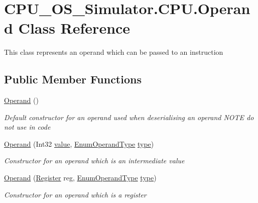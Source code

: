\hypertarget{class_c_p_u___o_s___simulator_1_1_c_p_u_1_1_operand}{}\section{C\+P\+U\+\_\+\+O\+S\+\_\+\+Simulator.\+C\+P\+U.\+Operand Class Reference}
\label{class_c_p_u___o_s___simulator_1_1_c_p_u_1_1_operand}


This class represents an operand which can be passed to an instruction  


\subsection*{Public Member Functions}
\begin{DoxyCompactItemize}
\item 
\hyperlink{class_c_p_u___o_s___simulator_1_1_c_p_u_1_1_operand_a8f6d642c2e5741c17748379c34a3052c}{Operand} ()
\begin{DoxyCompactList}\small\item\em Default constructor for an operand used when deserialising an operand N\+O\+T\+E do not use in code \end{DoxyCompactList}\item 
\hyperlink{class_c_p_u___o_s___simulator_1_1_c_p_u_1_1_operand_a66ce3c1acaa5f53e1f3af5276968b6e2}{Operand} (Int32 \hyperlink{class_c_p_u___o_s___simulator_1_1_c_p_u_1_1_operand_ab418a225965ed7e8d07649b218a7edd4}{value}, \hyperlink{namespace_c_p_u___o_s___simulator_1_1_c_p_u_ad49cfe442b74115a326c03b7ae848f76}{Enum\+Operand\+Type} \hyperlink{class_c_p_u___o_s___simulator_1_1_c_p_u_1_1_operand_abc8f504a22e9a5c49d91b12f61cc5119}{type})
\begin{DoxyCompactList}\small\item\em Constructor for an operand which is an intermediate value \end{DoxyCompactList}\item 
\hyperlink{class_c_p_u___o_s___simulator_1_1_c_p_u_1_1_operand_ab1da49c3f7978edcfa8c9b95e5804f08}{Operand} (\hyperlink{class_c_p_u___o_s___simulator_1_1_c_p_u_1_1_register}{Register} reg, \hyperlink{namespace_c_p_u___o_s___simulator_1_1_c_p_u_ad49cfe442b74115a326c03b7ae848f76}{Enum\+Operand\+Type} \hyperlink{class_c_p_u___o_s___simulator_1_1_c_p_u_1_1_operand_abc8f504a22e9a5c49d91b12f61cc5119}{type})
\begin{DoxyCompactList}\small\item\em Constructor for an operand which is a register \end{DoxyCompactList}\end{DoxyCompactItemize}
